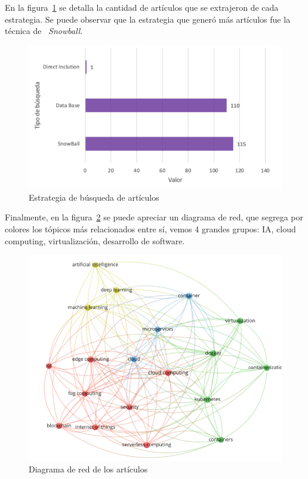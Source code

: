 En la figura~\ref{fig:estrategia-busqueda-articulos} se detalla la cantidad de artículos que se extrajeron de cada estrategia. Se puede observar que la estrategia que generó más artículos fue la técnica de ~\textit{Snowball}.

\begin{figure}[H]
    \centering
    \includegraphics[scale=0.8]{tablas-images/cp2/estrategia-busqueda-articulos.png}
    \caption{Estrategia de búsqueda de artículos}\label{fig:estrategia-busqueda-articulos}
\end{figure}

Finalmente, en la figura~\ref{fig:diagrama-red-articulos} se puede apreciar un diagrama de red, que segrega por colores los tópicos más relacionados entre sí, vemos 4 grandes grupos: IA, cloud computing, virtualización, desarrollo de software.

\begin{figure}[H]
    \centering
    \includegraphics[scale=0.9]{tablas-images/cp2/diagrama-red-busqueda.png}
    \caption{Diagrama de red de los artículos}\label{fig:diagrama-red-articulos}
\end{figure}